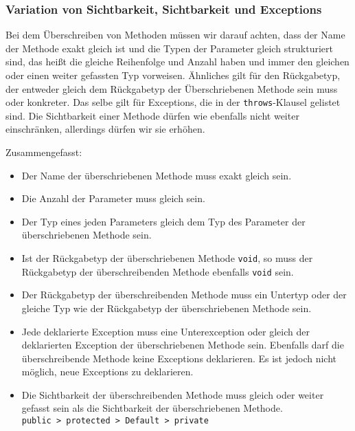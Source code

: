 	\subsubsection{Variation von Sichtbarkeit, Sichtbarkeit und Exceptions}
		Bei dem Überschreiben von Methoden müssen wir darauf achten, dass der Name der Methode exakt gleich ist und die Typen der Parameter gleich strukturiert sind, das heißt die gleiche Reihenfolge und Anzahl haben und immer den gleichen oder einen weiter gefassten Typ vorweisen. Ähnliches gilt für den Rückgabetyp, der entweder gleich dem Rückgabetyp der Überschriebenen Methode sein muss oder konkreter. Das selbe gilt für Exceptions, die in der \lstinline|throws|-Klausel gelistet sind. Die Sichtbarkeit einer Methode dürfen wie ebenfalls nicht weiter einschränken, allerdings dürfen wir sie erhöhen.
		
		Zusammengefasst:
		\begin{itemize}
			\item Der Name der überschriebenen Methode muss exakt gleich sein.
			\item Die Anzahl der Parameter muss gleich sein.
			\item Der Typ eines jeden Parameters gleich dem Typ des Parameter der überschriebenen Methode sein.
			\item Ist der Rückgabetyp der überschriebenen Methode \lstinline|void|, so muss der Rückgabetyp der überschreibenden Methode ebenfalls \lstinline|void| sein.
			\item Der Rückgabetyp der überschreibenden Methode muss ein Untertyp oder der gleiche Typ wie der Rückgabetyp der überschriebenen Methode sein.
			\item Jede deklarierte Exception muss eine Unterexception oder gleich der deklarierten Exception der überschriebenen Methode sein. Ebenfalls darf die überschreibende Methode keine Exceptions deklarieren. Es ist jedoch nicht möglich, neue Exceptions zu deklarieren.
			\item Die Sichtbarkeit der überschreibenden Methode muss gleich oder weiter gefasst sein als die Sichtbarkeit der überschriebenen Methode. \\ \lstinline|public > protected > Default > private|
		\end{itemize}
	
